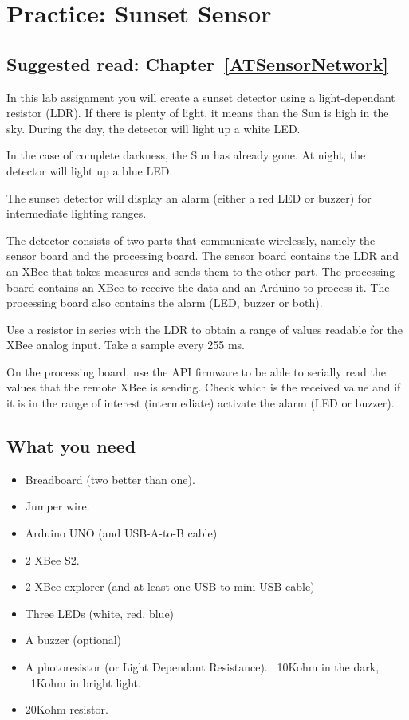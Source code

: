 \chapter{Practice: Sunset Sensor}\label{sunsetSensor}
\section*{Suggested read: Chapter~\ref{ATSensorNetwork}}

In this lab assignment you will create a sunset detector using a light-dependant resistor (LDR).
If there is plenty of light, it means than the Sun is high in the sky.
During the day, the detector will light up a white LED.

In the case of complete darkness, the Sun has already gone.
At night, the detector will light up a blue LED.

The sunset detector will display an alarm (either a red LED or buzzer) for intermediate lighting ranges.

The detector consists of two parts that communicate wirelessly, namely the sensor board and the processing board.
The sensor board contains the LDR and an XBee that takes measures and sends them to the other part.
The processing board contains an XBee to receive the data and an Arduino to process it.
The processing board also contains the alarm (LED, buzzer or both).

Use a resistor in series with the LDR to obtain a range of values readable for the XBee analog input.
Take a sample every 255 ms.

On the processing board, use the API firmware to be able to serially read the values that the remote XBee is sending.
Check which is the received value and if it is in the range of interest (intermediate) activate the alarm (LED or buzzer).

\section{What you need}

\begin{itemize}
\item Breadboard (two better than one).
\item Jumper wire.
\item Arduino UNO (and USB-A-to-B cable)
\item 2 XBee S2.
\item 2 XBee explorer (and at least one USB-to-mini-USB cable)
\item Three LEDs (white, red, blue)
\item A buzzer (optional)
\item A photoresistor (or Light Dependant Resistance). ~10Kohm in the dark, ~1Kohm in bright light.
\item 20Kohm resistor.
\end{itemize}

